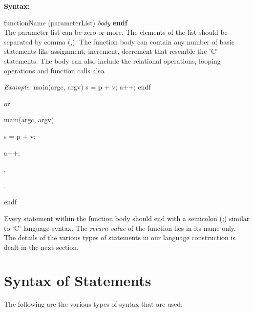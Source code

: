 \documentclass[12pt, oneside, a4paper]{article}
\begin{document}
\hspace{.5in} \textbf{Syntax:}
	
\hspace{1in}  functionName (parameterList) \emph{body} \textbf{endf}\\

The parameter list can be zero or more.  The elements of the list should be separated by comma (,).  The function body can contain any number of basic statements like assignment, increment, decrement that resemble the 'C' statements.  The body can also include the relational operations, looping operations and function calls also.

\emph{Example}: main(argc, argv) s = p + v; a++; endf

\hspace{1in} or

\hspace{.75in}main(argc, argv)

\hspace{1in}s = p + v;

\hspace{1in}a++;

\hspace{1.15in} .

\hspace{1.15in} .

\hspace{.75in}endf

Every statement within the function body should end with a semicolon (;) similar to `C' language syntax.
The \emph{return value} of the function lies in its name only.\\

The details of the various types of statements in our language construction is dealt in the next section.

\section{Syntax of Statements}
The following are the various types of syntax that are used:
\end{document}
